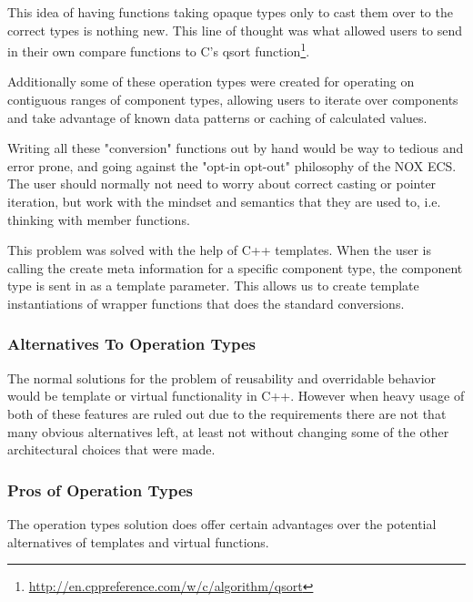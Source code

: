 This idea of having functions taking opaque types only to cast them over to the correct types is nothing new.
This line of thought was what allowed users to send in their own compare functions to C's qsort function\footnote{\url{http://en.cppreference.com/w/c/algorithm/qsort}}.

Additionally some of these operation types were created for operating on contiguous ranges of component types,
allowing users to iterate over components and take advantage of known data patterns or caching of calculated values.

Writing all these "conversion" functions out by hand would be way to tedious and error prone,
and going against the "opt-in opt-out" philosophy of the NOX ECS.
The user should normally not need to worry about correct casting or pointer iteration,
but work with the mindset and semantics that they are used to, i.e. thinking with member functions.

This problem was solved with the help of C++ templates.
When the user is calling the create meta information for a specific component type,
the component type is sent in as a template parameter.
This allows us to create template instantiations of wrapper functions that does the standard conversions.

\subsubsection{Alternatives To Operation Types}
The normal solutions for the problem of reusability and overridable behavior would be template or virtual
functionality in C++. However when heavy usage of both of these features are ruled out due to the requirements there are not that many obvious alternatives left,
at least not without changing some of the other architectural choices that were made.

\subsubsection{Pros of Operation Types}
The operation types solution does offer certain advantages over the potential alternatives of templates and virtual functions.

